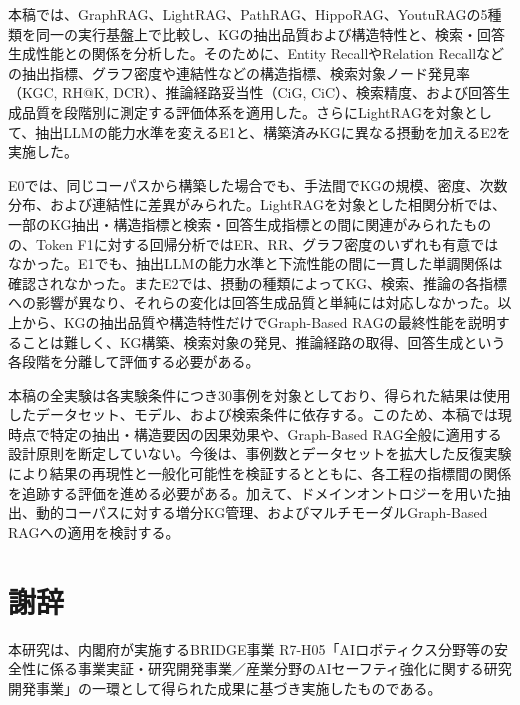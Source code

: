 \documentclass[a4j,dvipdfmx]{jsarticle}
\begin{document}
本稿では、GraphRAG、LightRAG、PathRAG、HippoRAG、YoutuRAGの5種類を同一の実行基盤上で比較し、KGの抽出品質および構造特性と、検索・回答生成性能との関係を分析した。そのために、Entity RecallやRelation Recallなどの抽出指標、グラフ密度や連結性などの構造指標、検索対象ノード発見率（KGC, RH@K, DCR）、推論経路妥当性（CiG, CiC）、検索精度、および回答生成品質を段階別に測定する評価体系を適用した。さらにLightRAGを対象として、抽出LLMの能力水準を変えるE1と、構築済みKGに異なる摂動を加えるE2を実施した。

E0では、同じコーパスから構築した場合でも、手法間でKGの規模、密度、次数分布、および連結性に差異がみられた。LightRAGを対象とした相関分析では、一部のKG抽出・構造指標と検索・回答生成指標との間に関連がみられたものの、Token F1に対する回帰分析ではER、RR、グラフ密度のいずれも有意ではなかった。E1でも、抽出LLMの能力水準と下流性能の間に一貫した単調関係は確認されなかった。またE2では、摂動の種類によってKG、検索、推論の各指標への影響が異なり、それらの変化は回答生成品質と単純には対応しなかった。以上から、KGの抽出品質や構造特性だけでGraph-Based RAGの最終性能を説明することは難しく、KG構築、検索対象の発見、推論経路の取得、回答生成という各段階を分離して評価する必要がある。

本稿の全実験は各実験条件につき30事例を対象としており、得られた結果は使用したデータセット、モデル、および検索条件に依存する。このため、本稿では現時点で特定の抽出・構造要因の因果効果や、Graph-Based RAG全般に適用する設計原則を断定していない。今後は、事例数とデータセットを拡大した反復実験により結果の再現性と一般化可能性を検証するとともに、各工程の指標間の関係を追跡する評価を進める必要がある。加えて、ドメインオントロジーを用いた抽出、動的コーパスに対する増分KG管理、およびマルチモーダルGraph-Based RAGへの適用を検討する。

\section*{謝辞}

本研究は、内閣府が実施するBRIDGE事業 R7-H05「AIロボティクス分野等の安全性に係る事業実証・研究開発事業／産業分野のAIセーフティ強化に関する研究開発事業」の一環として得られた成果に基づき実施したものである。

\small


\end{document}
